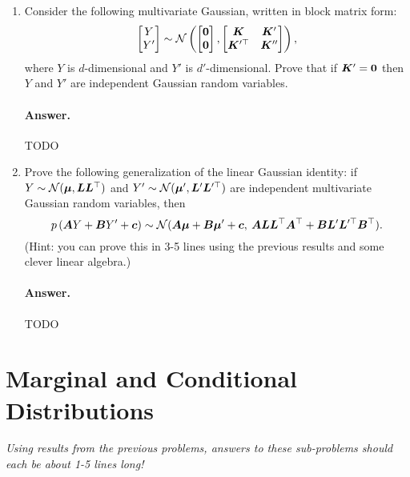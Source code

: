\documentclass[11pt,letterpaper]{article}
\newenvironment{answer}{%
    \vspace{1em}
    \color{black}
    \paragraph{Answer.}
  }{%
    \vspace{1em}
  }
\begin{document}
\begin{enumerate}[resume]
  \item
    Consider the following multivariate Gaussian, written in block matrix form:
    \begin{equation*}
      \begin{bmatrix} Y \\ Y^\prime \end{bmatrix}
      \sim
      \mathcal{N} \left(
        \begin{bmatrix}
          {\bm{0}} \\ {\bm{0}}
        \end{bmatrix},
        \begin{bmatrix}
          {\bm{K}} & {\bm{K}}^\prime \\
          {\bm{K}}^{\prime\top} & {\bm{K}}^{\prime\prime}
        \end{bmatrix}
      \right),
    \end{equation*}
    where $Y$ is $d$-dimensional and $Y'$ is $d'$-dimensional.
    Prove that if ${\bm{K}}' = {\bm{0}}$ then $Y$ and $Y'$ are independent Gaussian random variables.

\begin{answer}
  TODO
\end{answer}

  \item Prove the following generalization of the linear Gaussian identity:
    if $Y \sim \mathcal{N}({\bm{\mu}}, {\bm{L}}{\bm{L}}^\top)$ and $Y' \sim \mathcal{N}({\bm{\mu}}', {\bm{L}}' {\bm{L}}^{\prime\top})$ are independent multivariate Gaussian random variables, then
    \begin{equation}
      p\left( {\bm{A}} Y + {\bm{B}} Y' + {\bm{c}} \right) \sim \mathcal{N}({\bm{A}} {\bm{\mu}} + {\bm{B}} {\bm{\mu}}' + {\bm{c}}, \: {\bm{A}} {\bm{L}}{\bm{L}}^\top {\bm{A}}^\top + {\bm{B}} {\bm{L}}'{\bm{L}}^{\prime\top} {\bm{B}}^\top).
      \label{eqn:affine_density}
    \end{equation}
    (Hint: you can prove this in 3-5 lines using the previous results and some clever linear algebra.)

\begin{answer}
  TODO
\end{answer}

\end{enumerate}



\section{Marginal and Conditional Distributions}
\emph{Using results from the previous problems, answers to these sub-problems should each be about 1-5 lines long!}
\end{document}
